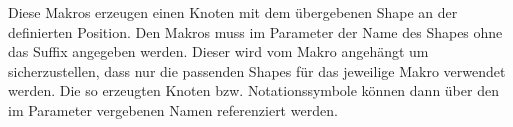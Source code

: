 \documentclass[12pt, a4paper]{article}
\begin{document}
\noindent\DescribeMacro{\memoprocess}\newline
\DescribeMacro{\memoevent}\newline
\DescribeMacro{\memoeventloaded}\newline
\DescribeMacro{\memoexception}\medskip

\noindent Diese Makros erzeugen einen Knoten mit dem übergebenen Shape an der definierten Position. Den Makros muss im Parameter  der Name des Shapes ohne das Suffix angegeben werden. Dieser wird vom Makro angehängt um sicherzustellen, dass nur die passenden Shapes für das jeweilige Makro verwendet werden. Die so erzeugten Knoten bzw. Notationssymbole können dann über den im Parameter  vergebenen Namen referenziert werden.
\end{document}

